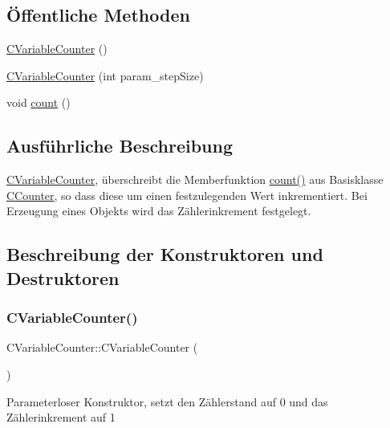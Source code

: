 \subsection*{Öffentliche Methoden}
\begin{DoxyCompactItemize}
\item 
\hyperlink{class_c_variable_counter_a76f4aa9bc231429b02678050eec85518}{C\+Variable\+Counter} ()
\item 
\hyperlink{class_c_variable_counter_aa4fb516a0618175dcb349dcb226e97c1}{C\+Variable\+Counter} (int param\+\_\+step\+Size)
\item 
void \hyperlink{class_c_variable_counter_a693c27202acd18d53c4642ce642927bc}{count} ()
\end{DoxyCompactItemize}


\subsection{Ausführliche Beschreibung}
\hyperlink{class_c_variable_counter}{C\+Variable\+Counter}, überschreibt die Memberfunktion \hyperlink{class_c_variable_counter_a693c27202acd18d53c4642ce642927bc}{count()} aus Basisklasse \hyperlink{class_c_counter}{C\+Counter}, so dass diese um einen festzulegenden Wert inkrementiert. Bei Erzeugung eines Objekts wird das Zählerinkrement festgelegt. 

\subsection{Beschreibung der Konstruktoren und Destruktoren}
\mbox{\label{class_c_variable_counter_a76f4aa9bc231429b02678050eec85518}} 
\subsubsection{\texorpdfstring{C\+Variable\+Counter()}{CVariableCounter()}\hspace{0.1cm}{\footnotesize\ttfamily [1/2]}}
{\footnotesize\ttfamily C\+Variable\+Counter\+::\+C\+Variable\+Counter (\begin{DoxyParamCaption}{ }\end{DoxyParamCaption})}

Parameterloser Konstruktor, setzt den Zählerstand auf 0 und das Zählerinkrement auf 1 \mbox{\label{class_c_variable_counter_aa4fb516a0618175dcb349dcb226e97c1}} 

